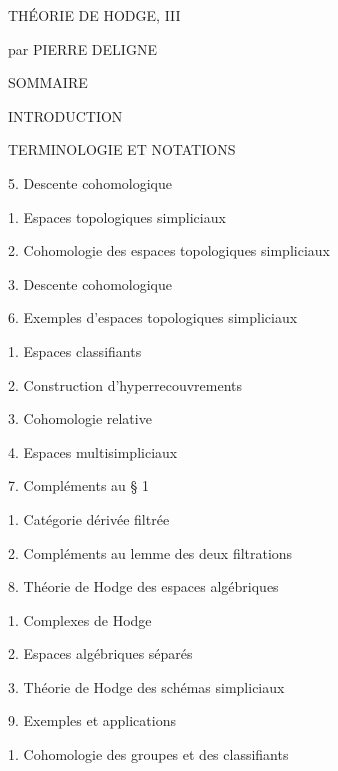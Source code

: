\documentclass[11pt,twoside]{article}
\begin{document}
THÉORIE DE HODGE, III\par
par PIERRE DELIGNE\par
\par\medskip
SOMMAIRE\par
\par\medskip
INTRODUCTION\par
TERMINOLOGIE ET NOTATIONS\par
5. Descente cohomologique\par
\hspace*{1em}1. Espaces topologiques simpliciaux\par
\hspace*{1em}2. Cohomologie des espaces topologiques simpliciaux\par
\hspace*{1em}3. Descente cohomologique\par
6. Exemples d’espaces topologiques simpliciaux\par
\hspace*{1em}1. Espaces classifiants\par
\hspace*{1em}2. Construction d’hyperrecouvrements\par
\hspace*{1em}3. Cohomologie relative\par
\hspace*{1em}4. Espaces multisimpliciaux\par
7. Compléments au § 1\par
\hspace*{1em}1. Catégorie dérivée filtrée\par
\hspace*{1em}2. Compléments au lemme des deux filtrations\par
8. Théorie de Hodge des espaces algébriques\par
\hspace*{1em}1. Complexes de Hodge\par
\hspace*{1em}2. Espaces algébriques séparés\par
\hspace*{1em}3. Théorie de Hodge des schémas simpliciaux\par
9. Exemples et applications\par
\hspace*{1em}1. Cohomologie des groupes et des classifiants\par
\end{document}
